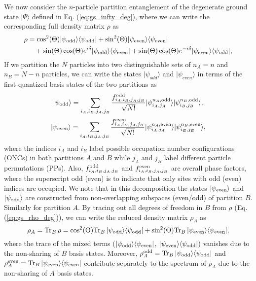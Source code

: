 We now consider the $n$-particle partition entanglement of the degenerate ground
state $\vert\Psi\rangle$ defined in Eq. (\ref{eq:gs_infty_deg}), where we can
write the corresponding full density matrix $\rho$ as 
\begin{align}
\rho &=\cos^2(\Theta)\vert\psi_{\rm{odd}}\rangle\langle\psi_{\rm{odd}}\vert+\sin^2(\Theta)\vert\psi_{\rm{even}}\rangle\langle\psi_{\rm{even}}\vert\nonumber\\
&\quad+\sin(\Theta)\cos(\Theta)e^{i\delta}\vert\psi_{\rm{odd}}\rangle\langle\psi_{\rm{even}}\vert+\sin(\Theta)\cos(\Theta)e^{-i\delta}\vert\psi_{\rm{even}}\rangle\langle\psi_{\rm{odd}}\vert,
\label{eq:gs_rho_deg}
\end{align}
If we partition the $N$ particles into two distinguishable sets 
of $n_A=n$ and $n_B=N-n$ particles, we can write the states $\vert
\psi_{odd}\rangle$ and $\vert \psi_{even}\rangle$ in terms of the
first-quantized basis states of the two partitions as
%
\begin{equation}
\vert \psi_{\rm{odd}}\rangle=\sum_{i_A,i_B,j_A,j_B} \frac{f_{i_A,i_B,j_A,j_B}^{\rm{odd}}}{\sqrt{N!}}\vert \psi^{n_A,\rm{odd}}_{i_A,j_A}\rangle\vert \psi^{n_B,\rm{odd}}_{i_B,j_B}\rangle
\label{Psi_odd_AB},
\end{equation}
%
\begin{equation}
\vert \psi_{\rm{even}}\rangle=\sum_{i_A,i_B,j_A,j_B} \frac{f_{i_A,i_B,j_A,j_B}^{\rm{even}}}{\sqrt{N!}}\vert \psi^{n_A,\rm{even}}_{i_A,j_A}\rangle\vert \psi^{n_B,\rm{even}}_{i_B,j_B}\rangle
\label{Psi_even_AB},
\end{equation}
%
where the indices $i_A$ and $i_B$ label possible  occupation number
configurations (ONCs) in both partitions $A$ and $B$ while $j_A$ and $j_B$
label different particle permutations (PPs). Also, $f_{i_A,i_B,j_A,j_B}^{\rm{odd}}$ and
$f_{i_A,i_B,j_A,j_B}^{\rm{even}}$ are overall phase factors, where the
superscript odd (even) is to indicate that only sites with odd (even) indices
are occupied.  We note that in this decomposition  the states
$\vert\psi_{\rm{even}}\rangle$ and $\vert \psi_{\rm{odd}}\rangle$ 
are constructed from non-overlapping subspaces (even/odd) of partition $B$.
Similarly for partition $A$.
By tracing out all degrees of freedom in $B$ from $\rho$ (Eq.
(\ref{eq:gs_rho_deg})), we can write the reduced density matrix $\rho_A$ as
%
\begin{equation}
    \rho_A = {\operatorname{Tr}}_{B}\,\rho= \cos^2(\Theta){\operatorname{Tr}}_{B}\,\vert\psi_{\rm{odd}}\rangle\langle\psi_{\rm{odd}}\vert+\sin^2(\Theta) {\operatorname{Tr}}_{B}\, \vert\psi_{\rm{even}}\rangle\langle\psi_{\rm{even}}\vert,
\label{eq:rho_A_final}
\end{equation}
%
where the trace of the mixed terms
($\vert\psi_{\rm{odd}}\rangle\langle\psi_{\rm{even}}\vert$,
$\vert\psi_{\rm{even}}\rangle\langle\psi_{\rm{odd}}\vert$) vanishes due to the
non-sharing of $B$ basis states.  Moreover, 
$\rho_A^{\rm odd}={\operatorname{Tr}}_{B}\,\vert\psi_{\rm{odd}}\rangle\langle\psi_{\rm{odd}}\vert$
and $\rho_A^{\rm even}={\operatorname{Tr}}_{B}\,
\vert\psi_{\rm{even}}\rangle\langle\psi_{\rm{even}}\vert$ contribute separately
to the spectrum of $\rho_A$ due to the non-sharing of $A$ basis states.

